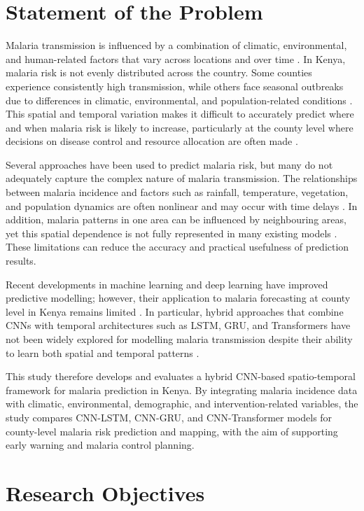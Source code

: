 \section{Statement of the Problem}
Malaria transmission is influenced by a combination of climatic, environmental, and human-related factors that vary across locations and over time \cite{amek2012spatial,Okunlola2019}. In Kenya, malaria risk is not evenly distributed across the country. Some counties experience consistently high transmission, while others face seasonal outbreaks due to differences in climatic, environmental, and population-related conditions \cite{Gething2023}. This spatial and temporal variation makes it difficult to accurately predict where and when malaria risk is likely to increase, particularly at the county level where decisions on disease control and resource allocation are often made \cite{Odhiambo2020}.

Several approaches have been used to predict malaria risk, but many do not adequately capture the complex nature of malaria transmission. The relationships between malaria incidence and factors such as rainfall, temperature, vegetation, and population dynamics are often nonlinear and may occur with time delays \cite{Syafei2023,Laneri2010}. In addition, malaria patterns in one area can be influenced by neighbouring areas, yet this spatial dependence is not fully represented in many existing models \cite{Odhiambo2020}. These limitations can reduce the accuracy and practical usefulness of prediction results.

Recent developments in machine learning and deep learning have improved predictive modelling; however, their application to malaria forecasting at county level in Kenya remains limited \cite{Odhiambo2020,Gething2023}. In particular, hybrid approaches that combine CNNs with temporal architectures such as LSTM, GRU, and Transformers have not been widely explored for modelling malaria transmission despite their ability to learn both spatial and temporal patterns \cite{Rasheed2023}.

This study therefore develops and evaluates a hybrid CNN-based spatio-temporal framework for malaria prediction in Kenya. By integrating malaria incidence data with climatic, environmental, demographic, and intervention-related variables, the study compares CNN-LSTM, CNN-GRU, and CNN-Transformer models for county-level malaria risk prediction and mapping, with the aim of supporting early warning and malaria control planning.
\section{Research Objectives}

